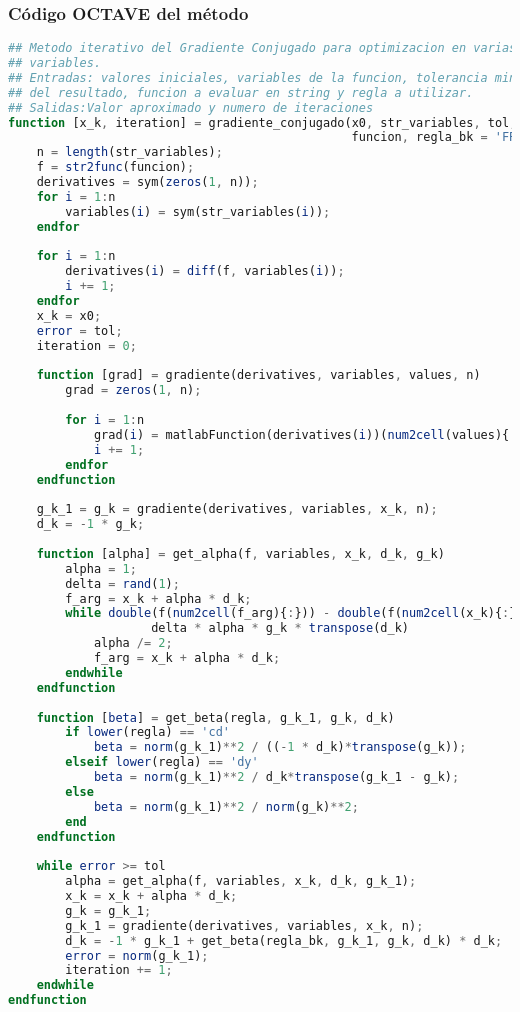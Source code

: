 \documentclass[12pt]{article}
\begin{document}
\subsubsection{Código OCTAVE del método}
\begin{lstlisting}[language=OCTAVE, caption=Implementación del método del Gradiente Conjugado en Octave]
## Metodo iterativo del Gradiente Conjugado para optimizacion en varias
## variables.
## Entradas: valores iniciales, variables de la funcion, tolerancia minima
## del resultado, funcion a evaluar en string y regla a utilizar.
## Salidas:Valor aproximado y numero de iteraciones
function [x_k, iteration] = gradiente_conjugado(x0, str_variables, tol,
                                                funcion, regla_bk = 'FR')
    n = length(str_variables);
    f = str2func(funcion);
    derivatives = sym(zeros(1, n));
    for i = 1:n
        variables(i) = sym(str_variables(i));
    endfor
    
    for i = 1:n
        derivatives(i) = diff(f, variables(i));
        i += 1;
    endfor
    x_k = x0;
    error = tol;
    iteration = 0;
    
    function [grad] = gradiente(derivatives, variables, values, n)
        grad = zeros(1, n);
        
        for i = 1:n
            grad(i) = matlabFunction(derivatives(i))(num2cell(values){:});
            i += 1;
        endfor
    endfunction
    
    g_k_1 = g_k = gradiente(derivatives, variables, x_k, n);
    d_k = -1 * g_k;
    
    function [alpha] = get_alpha(f, variables, x_k, d_k, g_k)
        alpha = 1;
        delta = rand(1);
        f_arg = x_k + alpha * d_k;
        while double(f(num2cell(f_arg){:})) - double(f(num2cell(x_k){:})) > 
                    delta * alpha * g_k * transpose(d_k)
            alpha /= 2;
            f_arg = x_k + alpha * d_k;
        endwhile    
    endfunction
   
    function [beta] = get_beta(regla, g_k_1, g_k, d_k)
        if lower(regla) == 'cd'
            beta = norm(g_k_1)**2 / ((-1 * d_k)*transpose(g_k));
        elseif lower(regla) == 'dy'
            beta = norm(g_k_1)**2 / d_k*transpose(g_k_1 - g_k);
        else
            beta = norm(g_k_1)**2 / norm(g_k)**2;
        end    
    endfunction
    
    while error >= tol
        alpha = get_alpha(f, variables, x_k, d_k, g_k_1);
        x_k = x_k + alpha * d_k;
        g_k = g_k_1;
        g_k_1 = gradiente(derivatives, variables, x_k, n);
        d_k = -1 * g_k_1 + get_beta(regla_bk, g_k_1, g_k, d_k) * d_k;
        error = norm(g_k_1);
        iteration += 1;
    endwhile
endfunction
\end{lstlisting}
\end{document}

